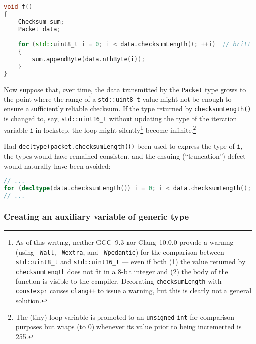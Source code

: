 \begin{lstlisting}[language=C++]
void f()
{
    Checksum sum;
    Packet data;

    for (std::uint8_t i = 0; i < data.checksumLength(); ++i)  // brittle
    {
        sum.appendByte(data.nthByte(i));
    }
}
\end{lstlisting}
    

Now suppose that, over time, the data transmitted by the \texttt{Packet}
type grows to the point where the range of a \texttt{std::uint8\_t}
value might not be enough to ensure a sufficiently reliable checksum. If
the type returned by \texttt{checksumLength()} is changed to, say,
\texttt{std::uint16\_t} without updating the type of the iteration
variable \texttt{i} in lockstep, the loop might
silently{\cprotect\footnote{As of this writing, neither
GCC~9.3 nor Clang~10.0.0 provide
a warning (using \texttt{-Wall}, \texttt{-Wextra}, and
\texttt{-Wpedantic}) for the comparison between \texttt{std::uint8\_t}
and \texttt{std::uint16\_t} --- even if both (1) the value returned by
\texttt{checksumLength} does not fit in a 8-bit integer and (2) the
body of the function is visible to the compiler. Decorating
\texttt{checksumLength} with \texttt{constexpr} causes
\texttt{clang++} to issue a warning, but this is clearly not a general
solution.}} become infinite.{\cprotect\footnote{The (tiny) loop
variable is promoted to an \texttt{unsigned} \texttt{int} for
comparison purposes but wraps (to 0) whenever its value prior to
  being incremented is 255.}}

Had \texttt{decltype(packet.checksumLength())} been used to express the
type of \texttt{i}, the types would have remained consistent and the
ensuing (``truncation'') defect would naturally have been avoided:

\begin{lstlisting}[language=C++]
// ...
for (decltype(data.checksumLength()) i = 0; i < data.checksumLength(); ++i)
// ...
\end{lstlisting}
    

\subsubsection[Creating an auxiliary variable of generic type]{Creating an auxiliary variable of generic type}\label{creating-an-auxiliary-variable-of-generic-type}

